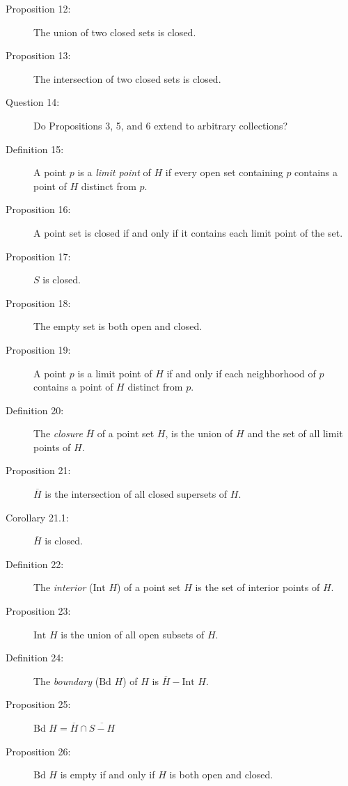 \documentclass{article}
\begin{document}
\begin{description}
  \item[Proposition 12:] The union of two closed sets is closed.

  \item[Proposition 13:] The intersection of two closed sets is closed.

  \item[Question 14:] Do Propositions 3, 5, and 6 extend to arbitrary collections?

  \item[Definition 15:] A point $p$ is a \emph{limit point} of $H$ if every open set containing $p$ contains a point of $H$ distinct from $p$.

  \item[Proposition 16:] A point set is closed if and only if it contains each limit point of the set.

  \item[Proposition 17:] $S$ is closed.

  \item[Proposition 18:] The empty set is both open and closed.

  \item[Proposition 19:] A point $p$ is a limit point of $H$ if and only if each neighborhood of $p$ contains a point of $H$ distinct from $p$.

  \item[Definition 20:] The \emph{closure} $\overline{H}$ of a point set $H$, is the union of $H$ and the set of all limit points of $H$.

  \item[Proposition 21:] $\overline{H}$ is the intersection of all closed supersets of $H$.

  \item[Corollary 21.1:] $\overline{H}$ is closed.

  \item[Definition 22:] The \emph{interior} ($\text{Int } H$) of a point set $H$ is the set of interior points of $H$.

  \item[Proposition 23:] $\text{Int } H$ is the union of all open subsets of $H$.

  \item[Definition 24:] The \emph{boundary} ($\text{Bd } H$) of $H$ is $\overline{H} - \text{Int } H$.

  \item[Proposition 25:] $\text{Bd } H = \overline{H} \cap \overline{S - H}$

  \item[Proposition 26:] $\text{Bd } H$ is empty if and only if $H$ is both open and closed.


\end{description}
\end{document}
